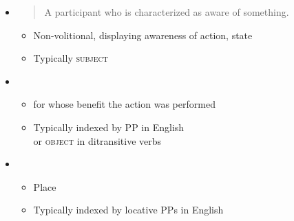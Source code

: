 \documentclass[headrule,footrule]{foils}
\begin{document}
\begin{itemize}
\item  {}
  \begin{quote}
    A participant who is characterized as aware of something.
  \end{quote}
  \begin{itemize}
  \item   Non-volitional, displaying awareness of action, state
  \item Typically \textsc{subject}
  \end{itemize}
  \begin{exe}
  \ex{}
  \ex{}
  \ex{}
\end{exe}
\newpage
\item  {}
  \begin{itemize}
  \item   for whose benefit the action was performed
  \item   Typically indexed by  PP in English
    \\ or \textsc{object} in ditransitive verbs
  \end{itemize}
  \begin{exe}
  \ex{}
  \ex{}
\end{exe}

\item  {}
  \begin{itemize}
  \item  Place
  \item Typically indexed by locative PPs in English
  \end{itemize}
  \begin{exe}
  \ex{}
  \ex{}
\end{exe}
\newpage  


\end{itemize}
\end{document}
